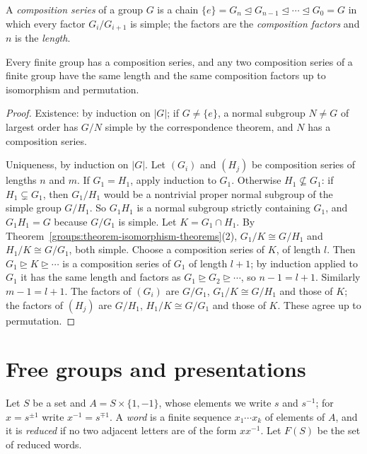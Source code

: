 \begin{definition}\label{groups:definition-composition-series}
A \emph{composition series} of a group $G$ is a chain
$\{e\} = G_n \trianglelefteq G_{n-1} \trianglelefteq \cdots \trianglelefteq G_0 = G$ in which every factor
$G_i/G_{i+1}$ is simple; the factors are the \emph{composition factors} and $n$ is
the \emph{length}.
\end{definition}

\begin{theorem}\label{groups:theorem-jordan-holder}
Every finite group has a composition series, and any two composition series of a
finite group have the same length and the same composition factors up to
isomorphism and permutation.
\end{theorem}

\begin{proof}
Existence: by induction on $|G|$; if $G \neq \{e\}$, a normal subgroup $N \neq G$ of
largest order has $G/N$ simple by the correspondence theorem, and $N$ has a
composition series.

Uniqueness, by induction on $|G|$. Let $(G_i)$ and $(H_j)$ be composition series of
lengths $n$ and $m$. If $G_1 = H_1$, apply induction to $G_1$. Otherwise
$H_1 \not\subseteq G_1$: if $H_1 \subsetneq G_1$, then $G_1/H_1$ would be a nontrivial proper
normal subgroup of the simple group $G/H_1$. So $G_1H_1$ is a normal subgroup strictly
containing $G_1$, and $G_1 H_1 = G$ because $G/G_1$ is simple.
Let $K = G_1 \cap H_1$. By Theorem~\ref{groups:theorem-isomorphism-theorems}(2),
$G_1/K \cong G/H_1$ and $H_1/K \cong G/G_1$, both simple. Choose a composition series of
$K$, of length $l$. Then $G_1 \trianglerighteq K \trianglerighteq \cdots$ is a composition series of $G_1$
of length $l + 1$; by induction applied to $G_1$ it has the same length and factors as
$G_1 \trianglerighteq G_2 \trianglerighteq \cdots$, so $n - 1 = l + 1$. Similarly $m - 1 = l + 1$. The factors of
$(G_i)$ are $G/G_1$, $G_1/K \cong G/H_1$ and those of $K$; the factors of $(H_j)$ are
$G/H_1$, $H_1/K \cong G/G_1$ and those of $K$. These agree up to permutation.
\end{proof}

\section{Free groups and presentations}\label{groups:section-free}

\begin{definition}\label{groups:definition-free-group}
Let $S$ be a set and $A = S \times \{1, -1\}$, whose elements we write $s$ and
$s^{-1}$; for $x = s^{\pm 1}$ write $x^{-1} = s^{\mp 1}$. A \emph{word} is a finite
sequence $x_1 \cdots x_k$ of elements of $A$, and it is \emph{reduced} if no two
adjacent letters are of the form $x x^{-1}$. Let $F(S)$ be the set of reduced words.
\end{definition}

